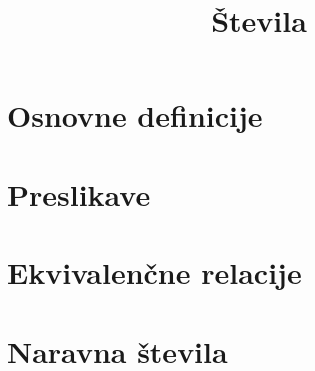 \documentclass[11pt]{article}
\title{Števila}
\begin{document}
    \maketitle
    \pagebreak

    \section{Osnovne definicije}
    
    \pagebreak

    \section{Preslikave}
    
    \pagebreak

    \section{Ekvivalenčne relacije}
    
    \pagebreak

    \section{Naravna števila}
    
    \pagebreak
\end{document}

